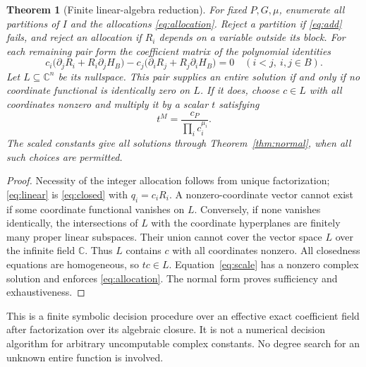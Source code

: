 \documentclass[11pt]{article}
\numberwithin{equation}{section}
\newtheorem{theorem}{Theorem}[section]
\theoremstyle{definition}\newtheorem{definition}[theorem]{Definition}
\theoremstyle{remark}\newtheorem{remark}[theorem]{Remark}
\newcommand{\C}{\mathbb C}
\begin{document}
\begin{theorem}[Finite linear-algebra reduction]\label{thm:algorithm}
For fixed $P,G,\mu$, enumerate all partitions of $I$ and the allocations
\eqref{eq:allocation}. Reject a partition if \eqref{eq:add} fails, and
reject an allocation if $R_i$ depends on a variable outside its block.
For each remaining pair form the coefficient matrix of the polynomial
identities
\begin{equation}\label{eq:linear}
 c_i\bigl(\partial_jR_i+R_i\partial_jH_B\bigr)
 -c_j\bigl(\partial_iR_j+R_j\partial_iH_B\bigr)=0
 \quad(i<j,\ i,j\in B).
\end{equation}
Let $L\subseteq\C^n$ be its nullspace. This pair supplies an entire
solution if and only if no coordinate functional is identically zero on
$L$. If it does, choose $c\in L$ with all coordinates nonzero and multiply
it by a scalar $t$ satisfying
\begin{equation}\label{eq:scale}
 t^M=\frac{c_P}{\prod_i c_i^{\mu_i}}.
\end{equation}
The scaled constants give all solutions through Theorem~\ref{thm:normal},
when all such choices are permitted.
\end{theorem}
\begin{proof}
Necessity of the integer allocation follows from unique factorization;
\eqref{eq:linear} is \eqref{eq:closed} with $q_i=c_iR_i$.
A nonzero-coordinate vector cannot exist if some coordinate functional
vanishes on $L$. Conversely, if none vanishes identically, the intersections
of $L$ with the coordinate hyperplanes are finitely many proper linear
subspaces. Their union cannot cover the vector space $L$ over the infinite
field $\C$. Thus $L$ contains $c$ with all coordinates nonzero. All
closedness equations are homogeneous, so $tc\in L$. Equation~\eqref{eq:scale}
has a nonzero complex solution and enforces \eqref{eq:allocation}.
The normal form proves sufficiency and exhaustiveness.
\end{proof}

This is a finite symbolic decision procedure over an effective exact
coefficient field after factorization over its algebraic closure. It is
not a numerical decision algorithm for arbitrary uncomputable complex
constants. No degree search for an unknown entire function is involved.
\end{document}
